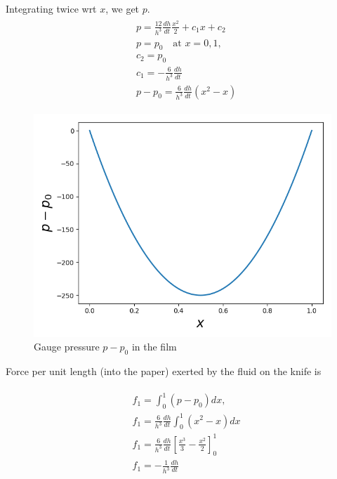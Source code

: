 \documentclass{article}
\begin{document}
Integrating twice wrt $x$, we get $p$. 
\begin{align}\label{eq:thin_film_p}
 \begin{split}
  & p = \frac{12}{h^{3}}\frac{dh}{dt} \frac{x^{2}}{2} + c_{1}x + c_{2}\\
  & p = p_{0} \quad \textrm{at }x = 0, 1, \\
  & c_{2} = p_{0}\\
  &c_{1} =-\frac{6}{h^{3}}\frac{dh}{dt} \\
  & p - p_{0} = \frac{6}{h^{3}}\frac{dh}{dt}(x^{2}-x)
 \end{split}
\end{align}
%
\begin{figure}[H]
    \centering
    \includegraphics[scale = 0.5]{Figs/knife_gauge_p.png}
    \caption{Gauge pressure $p-p_{0}$ in the film}
    \label{fig:knife_gauge_p}
\end{figure}
%
Force per unit length (into the paper) exerted by the fluid on the knife is 

\begin{align}\label{eq:thin_film_force}
 \begin{split}
  & f_{1} = \int_{0}^{1} (p - p_{0}) dx, \\
  & f_{1} = \frac{6}{h^{3}}\frac{dh}{dt} \int_{0}^{1}(x^{2}-x) dx\\
  & f_{1} = \frac{6}{h^{3}}\frac{dh}{dt} \left[\frac{x^{3}}{3} - \frac{x^{2}}{2}\right]_{0}^{1}\\
  & f_{1} = -\frac{1}{h^{3}}\frac{dh}{dt}
 \end{split}
\end{align}
\end{document}
